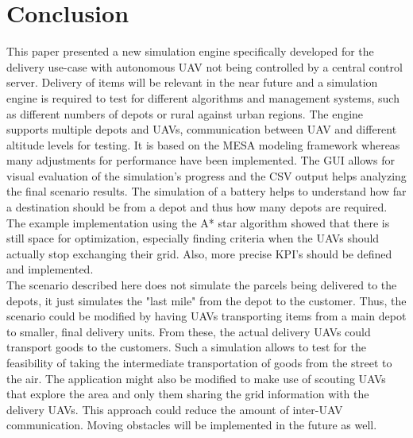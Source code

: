\section{Conclusion}\label{sec:conclusion}
This paper presented a new simulation engine specifically developed for the delivery use-case with autonomous UAV not being controlled by a central control server. Delivery of items will be relevant in the near future and a simulation engine is required to test for different algorithms and management systems, such as different numbers of depots or rural against urban regions. The engine supports multiple depots and UAVs, communication between UAV and different altitude levels for testing. It is based on the MESA modeling framework whereas many adjustments for performance have been implemented. The GUI allows for visual evaluation of the simulation's progress and the CSV output helps analyzing the final scenario results. The simulation of a battery helps to understand how far a destination should be from a depot and thus how many depots are required. \\
The example implementation using the A* star algorithm showed that there is still space for optimization, especially finding criteria when the UAVs should actually stop exchanging their grid. Also, more precise KPI's should be defined and implemented.\\
The scenario described here does not simulate the parcels being delivered to the depots, it just simulates the "last mile" from the depot to the customer. Thus, the scenario could be modified by having UAVs transporting items from a main depot to smaller, final delivery units. From these, the actual delivery UAVs could transport goods to the customers. Such a simulation allows to test for the feasibility of taking the intermediate transportation of goods from the street to the air. The application might also be modified to make use of scouting UAVs that explore the area and only them sharing the grid information with the delivery UAVs. This approach could reduce the amount of inter-UAV communication. Moving obstacles will be implemented in the future as well.
